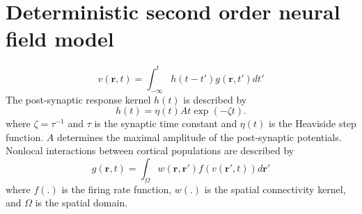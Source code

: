 \documentclass[a4paper,10pt]{article}
\begin{document}
\section{Deterministic second order neural field model}
\begin{equation}\label{SpikesToPotential}
	v\left( {\mathbf{r},t} \right) = \int_{ - \infty }^t {h\left( {t - t'} \right)g\left( {\mathbf{r},t'} \right)dt'}
\end{equation}
The post-synaptic response kernel $h(t)$ is described by
\begin{equation}\label{SynapticRespKernel}
	h(t) = \eta(t)At\exp{\left(-\zeta t\right)}.
\end{equation}
where $\zeta=\tau^{-1}$ and $\tau$ is the synaptic time constant and $\eta(t)$ is the Heaviside step function. $A$ determines the maximal amplitude of the post-synaptic potentials.
Nonlocal interactions between cortical populations are described by	
\begin{equation}\label{RateBasedInteractions}
	g\left( \mathbf{r},t \right) = \int_\Omega  {w\left( \mathbf{r},\mathbf{r}' \right)f\left( v\left( \mathbf{r}',t \right) \right)d\mathbf{r}'} 
\end{equation}
where $f(.)$ is the firing rate function, $w(.)$ is the spatial connectivity kernel, and $\Omega$ is the spatial domain.
\end{document}
